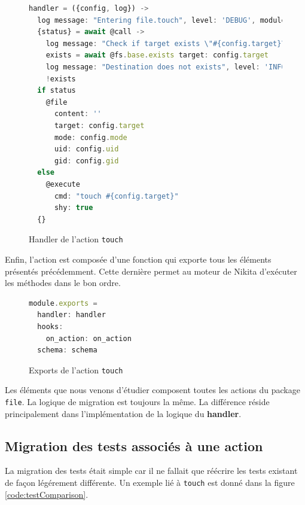\documentclass[12pt, french]{report}
\begin{document}
\begin{figure}[h]
\begin{lstlisting}[language=JavaScript]
handler = ({config, log}) ->
  log message: "Entering file.touch", level: 'DEBUG', module: 'nikita/lib/file/touch'
  {status} = await @call ->
    log message: "Check if target exists \"#{config.target}\"", level: 'DEBUG', module: 'nikita/lib/file/touch'
    exists = await @fs.base.exists target: config.target
    log message: "Destination does not exists", level: 'INFO', module: 'nikita/lib/file/touch' if not exists
    !exists
  if status
    @file
      content: ''
      target: config.target
      mode: config.mode
      uid: config.uid
      gid: config.gid
  else
    @execute
      cmd: "touch #{config.target}"
      shy: true
  {}
\end{lstlisting}
\centering
\caption{Handler de l'action \texttt{touch}}
\label{code:touchHandler}
\end{figure}

Enfin, l'action est composée d'une fonction qui exporte tous les éléments présentés précédemment. Cette dernière permet au moteur de Nikita d'exécuter les méthodes dans le bon ordre.

\begin{figure}[h]
\begin{lstlisting}[language=JavaScript]
module.exports =
  handler: handler
  hooks:
    on_action: on_action
  schema: schema
\end{lstlisting}
\centering
\caption{Exports de l'action \texttt{touch}}
\label{code:touchExports}
\end{figure}

Les éléments que nous venons d'étudier composent toutes les actions du package \texttt{file}. La logique de migration est toujours la même. La différence réside principalement dans l'implémentation de la logique du \textbf{handler}.

\subsection{Migration des tests associés à une action}

La migration des tests était simple car il ne fallait que réécrire les tests existant de façon légérement différente. Un exemple lié à \texttt{touch} est donné dans la figure \ref{code:testComparison}.
\end{document}

